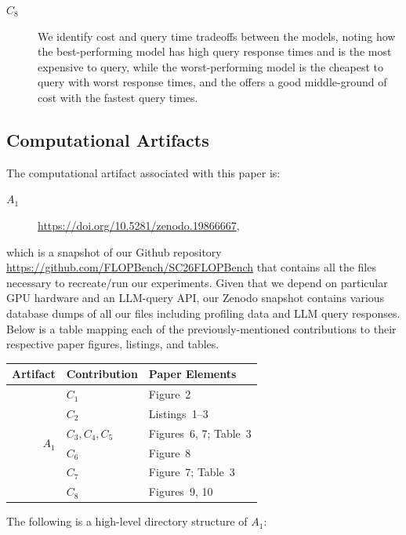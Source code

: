 \documentclass[conference]{IEEEtran}
\begin{document}
\begin{description}
\item[$C_8$] We identify cost and query time tradeoffs between the models, noting how the best-performing \opus model has high query response times and is the most expensive to query, while the worst-performing \gptoss model is the cheapest to query with worst response times, and the \gptfivefour offers a good middle-ground of cost with the fastest query times.
\end{description}


\subsection{Computational Artifacts}

The computational artifact associated with this paper is:

\begin{description}
\item[$A_1$] \url{https://doi.org/10.5281/zenodo.19866667},
\end{description}

which is a snapshot of our Github repository \url{https://github.com/FLOPBench/SC26FLOPBench} that contains all the files necessary to recreate/run our experiments.
Given that we depend on particular GPU hardware and an LLM-query API, our Zenodo snapshot contains various database dumps of all our files including profiling data and LLM query responses.
Below is a table mapping each of the previously-mentioned contributions to their respective paper figures, listings, and tables.

\begin{center}
\begin{tabular}{rll}
\toprule
Artifact  &  Contribution  &  Paper Elements \\
\midrule
\multirow{8}{*}{$A_1$} & $C_1$ & Figure~2 \\
                       & $C_2$ & Listings~1--3 \\
                       & $C_3,C_4,C_5$ & Figures~6, 7; Table~3 \\
                       & $C_6$ & Figure~8 \\
                       & $C_7$ & Figure~7; Table~3 \\
                       & $C_8$ & Figures~9, 10 \\
\bottomrule
\end{tabular}
\end{center}

The following is a high-level directory structure of $A_1$:
\end{document}
